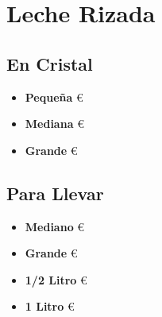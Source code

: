 \documentclass[a4paper,12pt]{article}
\begin{document}
\section*{Leche Rizada}
\begin{multicols}{2}
\subsection*{En Cristal}
\begin{itemize}
    \item \textbf{Pequeña}  €
    \item \textbf{Mediana}  €
    \item \textbf{Grande}  €
\end{itemize}

\columnbreak

\subsection*{Para Llevar}
\begin{itemize}
    \item \textbf{Mediano}  €
    \item \textbf{Grande}  €
    \item \textbf{1/2 Litro}  €
    \item \textbf{1 Litro}  €
\end{itemize}
\end{multicols} 
\end{document}
